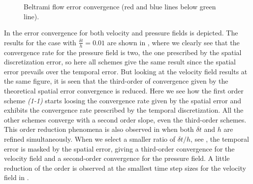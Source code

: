 \begin{figure}[h!]
  \centering
  \caption{Beltrami flow error convergence (red and blue lines below green line).}
  \label{fig-beltrami}
\end{figure}
In  the error convergence for both velocity and pressure fields is depicted. The results for the case with $\frac{\delta t}{h}=0.01$ are shown in , where we clearly see that the convergence rate for the pressure field is two, the one prescribed by the spatial discretization error, so here all schemes give the same result since the spatial error prevails over the temporal error. But looking at the velocity field results at the same figure, it is seen that the third-order of convergence given by the theoretical spatial error convergence is reduced. Here we see how the first order scheme \textit{(1-1)} starts loosing the convergence rate given by the spatial error and exhibits the convergence rate prescribed by the temporal discretization. All the other schemes converge with a second order slope, even the third-order schemes. This order reduction phenomena is also observed in \cite{sanz-serna_convergence_1986} when both $\delta t$ and $h$ are refined simultaneously.
When we select a smaller ratio of $\delta t/h$, see , the temporal error is masked by the spatial error, giving a third-order convergence for the velocity field and a second-order convergence for the pressure field. A little reduction of the order is observed at the smallest time step sizes for the velocity field in .

